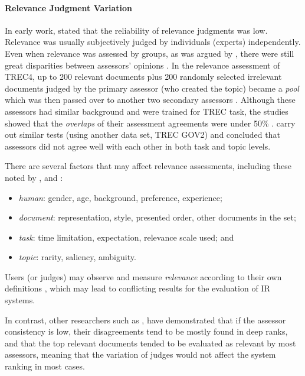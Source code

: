\documentclass{article}
\begin{document}
\paragraph{Relevance Judgment Variation}
In early work, \citet{influence.scale.form.rel.judge} stated that the reliability of relevance judgments was low. Relevance was usually subjectively judged by individuals (experts) independently. Even when relevance was assessed by groups, as was argued by \citet{variation.rel.judge.measure}, there were still great disparities between assessors' opinions \cite{judges.exchangeable.matter}. In the relevance assessment of TREC4, up to 200 relevant documents plus 200 randomly selected irrelevant documents judged by the primary assessor (who created the topic) became a \textit{pool} which was then passed over to another two secondary assessors \cite{variation.rel.judge.measure}. Although these assessors had similar background and were trained for TREC task, the studies showed that the \textit{overlaps} of their assessment agreements were under 50\% \cite{variation.rel.judge.measure}. \citet{disagree.btw.judges} carry out similar tests (using another data set, TREC GOV2) and concluded that assessors did not agree well with each other in both task and topic levels.

There are several factors that may affect relevance assessments, including these noted by \citet{burgin.variation.rel.judge.measure}, \citet{disagree.btw.judges} and \citet{methods.for.IIR}:

\begin{itemize}
\item \textit{human}: gender, age, background, preference, experience;
\item \textit{document}: representation, style, presented order, other documents in the set;
\item \textit{task}: time limitation, expectation, relevance scale used; and
\item \textit{topic}: rarity, saliency, ambiguity.
\end{itemize}
Users (or judges) may observe and measure \textit{relevance} according to their own definitions \cite{methods.for.IIR}, which may lead to conflicting results for the evaluation of IR systems.

In contrast, other researchers such as \citet{comp.eval.index.proc}, have demonstrated that if the assessor consistency is low, their disagreements tend to be mostly found in deep ranks, and that the top relevant documents tended to be evaluated as relevant by most assessors, meaning that the variation of judges would not affect the system ranking in most cases.
\end{document}
